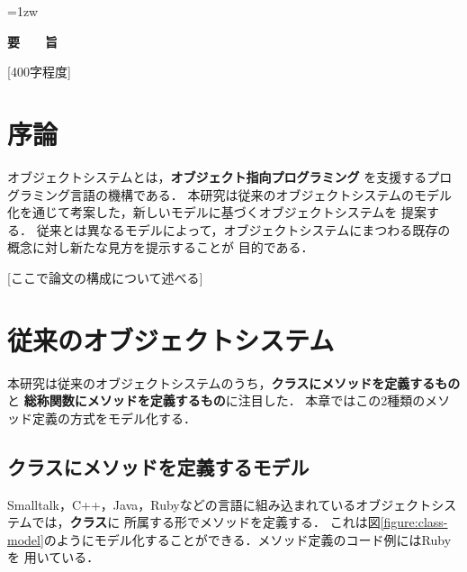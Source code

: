 \documentclass[a4paper,11pt,dvipdfmx]{jreport}
\title{\Underline{Containerless：オブジェクトシステムの新しいとらえ方}}
\author{林 拓人}
\begin{document}
\maketitle
\thispagestyle{empty}
\newpage

\thispagestyle{empty}
\vspace*{20pt plus 1fil}
\parindent=1zw
\noindent
\begin{center}
{\Large \bf 要　　旨}
\vspace{2cm}
\end{center}
[400字程度]

\par
\vspace{0pt plus 1fil}
\newpage

\tableofcontents
\listoffigures

\pagebreak \setcounter{page}{1}


\chapter{序論}

オブジェクトシステムとは，\textbf{オブジェクト指向プログラミング}\cite{Stroustrup:1988:OP:624569.624721}
を支援するプログラミング言語の機構である．
本研究は従来のオブジェクトシステムのモデル化を通じて考案した，新しいモデルに基づくオブジェクトシステムを
提案する．
従来とは異なるモデルによって，オブジェクトシステムにまつわる既存の概念に対し新たな見方を提示することが
目的である．

[ここで論文の構成について述べる]


\chapter{従来のオブジェクトシステム}
\label{chapter:conventional}

本研究は従来のオブジェクトシステムのうち，\textbf{クラスにメソッドを定義するもの}と
\textbf{総称関数にメソッドを定義するもの}に注目した．
本章ではこの2種類のメソッド定義の方式をモデル化する．

\section{クラスにメソッドを定義するモデル}
\label{section:class-model}

Smalltalk，C++，Java，Rubyなどの言語に組み込まれているオブジェクトシステムでは，\textbf{クラス}に
所属する形でメソッドを定義する．
これは図\ref{figure:class-model}のようにモデル化することができる．メソッド定義のコード例にはRubyを
用いている．
\end{document}
